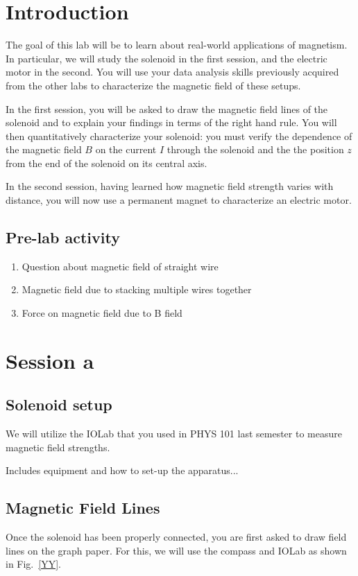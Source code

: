 \documentclass[12pt]{report}
\begin{document}
\section{Introduction}
The goal of this lab will be to learn about real-world applications of magnetism. In particular, we will study the solenoid in the first session, and the electric motor in the second. You will use your data analysis skills previously acquired from the other labs to characterize the magnetic field of these setups.

In the first session, you will be asked to draw the magnetic field lines of the solenoid and to explain your findings in terms of the right hand rule. You will then quantitatively characterize your solenoid: you must verify the dependence of the magnetic field $B$ on the current $I$ through the solenoid and the the position $z$ from the end of the solenoid on its central axis.

In the second session, having learned how magnetic field strength varies with distance, you will now use a permanent magnet to characterize an electric motor.

\subsection{Pre-lab activity}
\begin{enumerate}
\item Question about magnetic field of straight wire
\item Magnetic field due to stacking multiple wires together
\item Force on magnetic field due to B field
\end{enumerate}

\section{Session a}
\subsection{Solenoid setup}
We will utilize the IOLab that you used in PHYS 101 last semester to measure magnetic field strengths.

Includes equipment and how to set-up the apparatus...

\subsection{Magnetic Field Lines}
Once the solenoid has been properly connected, you are first asked to draw field lines on the graph paper. For this, we will use the compass and IOLab as shown in Fig.~\ref{YY}.
\end{document}
